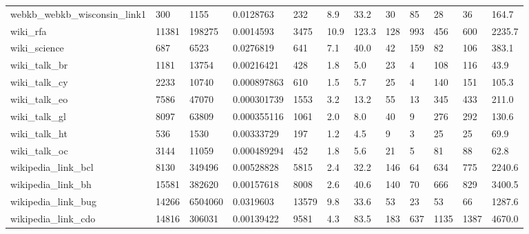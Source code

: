 \begin{longtable}{llllllllllll}
 webkb\_webkb\_wisconsin\_link1                        & 300        & 1155      & 0.0128763   & 232   & 8.9    & 33.2   & 30    & 85     & 28     & 36     & 164.7   \\
 wiki\_rfa                                           & 11381      & 198275    & 0.0014593   & 3475  & 10.9   & 123.3  & 128   & 993    & 456    & 600    & 2235.7  \\
 wiki\_science                                       & 687        & 6523      & 0.0276819   & 641   & 7.1    & 40.0   & 42    & 159    & 82     & 106    & 383.1   \\
 wiki\_talk\_br                                       & 1181       & 13754     & 0.00216421  & 428   & 1.8    & 5.0    & 23    & 4      & 108    & 116    & 43.9    \\
 wiki\_talk\_cy                                       & 2233       & 10740     & 0.000897863 & 610   & 1.5    & 5.7    & 25    & 4      & 140    & 151    & 105.3   \\
 wiki\_talk\_eo                                       & 7586       & 47070     & 0.000301739 & 1553  & 3.2    & 13.2   & 55    & 13     & 345    & 433    & 211.0   \\
 wiki\_talk\_gl                                       & 8097       & 63809     & 0.000355116 & 1061  & 2.0    & 8.0    & 40    & 9      & 276    & 292    & 130.6   \\
 wiki\_talk\_ht                                       & 536        & 1530      & 0.00333729  & 197   & 1.2    & 4.5    & 9     & 3      & 25     & 25     & 69.9    \\
 wiki\_talk\_oc                                       & 3144       & 11059     & 0.000489294 & 452   & 1.8    & 5.6    & 21    & 5      & 81     & 88     & 62.8    \\
 wikipedia\_link\_bcl                                 & 8130       & 349496    & 0.00528828  & 5815  & 2.4    & 32.2   & 146   & 64     & 634    & 775    & 2240.6  \\
 wikipedia\_link\_bh                                  & 15581      & 382620    & 0.00157618  & 8008  & 2.6    & 40.6   & 140   & 70     & 666    & 829    & 3400.5  \\
 wikipedia\_link\_bug                                 & 14266      & 6504060   & 0.0319603   & 13579 & 9.8    & 33.6   & 53    & 23     & 53     & 66     & 1287.6  \\
 wikipedia\_link\_cdo                                 & 14816      & 306031    & 0.00139422  & 9581  & 4.3    & 83.5   & 183   & 637    & 1135   & 1387   & 4670.0  \\

\end{longtable}
